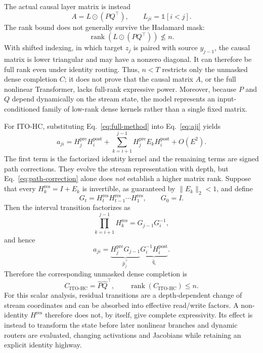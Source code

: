 \documentclass{article}
\newcommand{\Hpre}{H^{\mathrm{pre}}}
\newcommand{\Hpost}{H^{\mathrm{post}}}
\newcommand{\Hres}{H^{\mathrm{res}}}
\newcommand{\norm}[1]{\lVert #1\rVert}
\begin{document}
The actual causal layer matrix is instead
\begin{equation}
 A=L\odot(PQ^\top),\qquad L_{ji}=\mathbb{1}[i<j].
 \label{eq:masked}
\end{equation}
The rank bound does not generally survive the Hadamard mask:
\begin{equation}
 \operatorname{rank}\!\left(L\odot(PQ^\top)\right)\nleq n.
\end{equation}
With shifted indexing, in which target $z_j$ is paired with source $y_{j-1}$, the causal matrix is lower triangular and may have a nonzero diagonal. It can therefore be full rank even under identity routing. Thus, $n<T$ restricts only the unmasked dense completion $C$; it does not prove that the causal matrix $A$, or the full nonlinear Transformer, lacks full-rank expressive power. Moreover, because $P$ and $Q$ depend dynamically on the stream state, the model represents an input-conditioned family of low-rank dense kernels rather than a single fixed matrix.

For ITO-HC, substituting Eq.~\ref{eq:full-method} into Eq.~\ref{eq:aji} yields
\begin{equation}
 a_{ji}=\Hpre_j\Hpost_i+
 \sum_{k=i+1}^{j-1}\Hpre_jE_k\Hpost_i+O(E^2).
 \label{eq:path-correction}
\end{equation}
The first term is the factorized identity kernel and the remaining terms are signed path corrections. They evolve the stream representation with depth, but Eq.~\ref{eq:path-correction} alone does \emph{not} establish a higher matrix rank. Suppose that every $\Hres_k=I+E_k$ is invertible, as guaranteed by $\norm{E_k}_2<1$, and define
\begin{equation}
 G_t=\Hres_t\Hres_{t-1}\cdots\Hres_1,
 \qquad G_0=I.
\end{equation}
Then the interval transition factorizes as
\begin{equation}
 \prod_{k=i+1}^{j-1}\Hres_k=G_{j-1}G_i^{-1},
\end{equation}
and hence
\begin{equation}
 a_{ji}
 =\underbrace{\Hpre_jG_{j-1}}_{\widehat p_j^\top}
  \underbrace{G_i^{-1}\Hpost_i}_{\widehat q_i}.
 \label{eq:gauge-factorization}
\end{equation}
Therefore the corresponding unmasked dense completion is
\begin{equation}
 C_{\mathrm{ITO\text{-}HC}}=\widehat P\widehat Q^\top,
 \qquad \operatorname{rank}(C_{\mathrm{ITO\text{-}HC}})\le n.
 \label{eq:ito-rank}
\end{equation}
For this scalar analysis, residual transitions are a depth-dependent change of stream coordinates and can be absorbed into effective read/write factors. A non-identity $\Hres$ therefore does not, by itself, give complete expressivity. Its effect is instead to transform the state before later nonlinear branches and dynamic routers are evaluated, changing activations and Jacobians while retaining an explicit identity highway.
\end{document}

